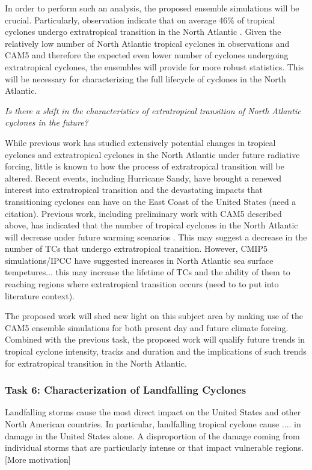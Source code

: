 \documentclass[11pt]{article}
\begin{document}
In order to perform such an analysis, the proposed ensemble simulations will be crucial.  Particularly, observation indicate that on average 46$\%$ of tropical cyclones undergo extratropical transition in the North Atlantic \citep{hart2001climatology}. Given the relatively low number of North Atlantic tropical cyclones in observations and CAM5 and therefore the expected even lower number of cyclones undergoing extratropical cyclones, the ensembles will provide for more robust statistics. This will be necessary for characterizing the full lifecycle of cyclones in the North Atlantic. 

\emph{Is there a shift in the characteristics of extratropical transition of North Atlantic cyclones in the future?}

While previous work has studied extensively potential changes in tropical cyclones and extratropical cyclones in the North Atlantic under future radiative forcing, little is known to how the process of extratropical transition will be altered. Recent events, including Hurricane Sandy, have brought a renewed interest into extratropical transition and the devastating impacts that transitioning cyclones can have on the East Coast of the United States (need a citation). Previous work, including preliminary work with CAM5 described above, has indicated that the number of tropical cyclones in the North Atlantic will decrease under future warming scenarios \citep{Knutson2010}. This may suggest a decrease in the number of TCs that undergo extratropical transition.  However, CMIP5 simulations/IPCC have suggested increases in North Atlantic sea surface tempetures... this may increase the lifetime of TCs and the ability of them to reaching regions where extratropical transition occurs (need to to put into literature context).

The proposed work will shed new light on this subject area by making use of the CAM5 ensemble simulations for both present day and future climate forcing. Combined with the previous task, the proposed work will qualify future trends in tropical cyclone intensity, tracks and duration and the implications of such trends for extratropical transition in the North Atlantic.

\subsubsection{Task 6: Characterization of Landfalling Cyclones}

Landfalling storms cause the most direct impact on the United States and other North American countries.  In particular, landfalling tropical cyclone cause .... in damage in the United States alone. A disproportion of the damage coming from individual storms that are particularly intense or that impact vulnerable regions.  {\color{red}[More motivation]}
\end{document}
